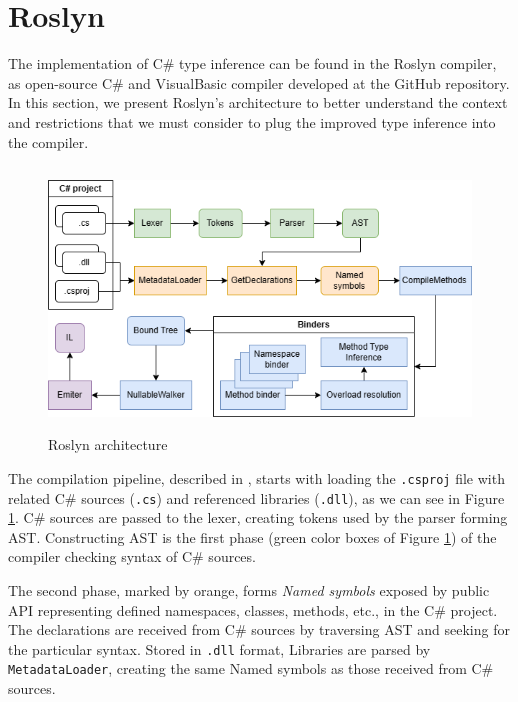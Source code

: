 \section{Roslyn}

The implementation of C\# type inference can be found in the Roslyn compiler, as open-source C\# and VisualBasic compiler developed at the GitHub repository. 
In this section, we present Roslyn’s architecture to better understand the context and restrictions that we must consider to plug the improved type inference into the compiler.
\par
\begin{figure}
\centering
\includegraphics[width=120mm, height=70mm]{../img/Roslyn_Arch.png}
\caption{Roslyn architecture}
\label{img56:roslynPip}
\end{figure}
\par
{}
The compilation pipeline, described in \cite{online:roslynArchitecture}, starts with loading the \texttt{.csproj} file with related C\# sources (\texttt{.cs}) and referenced libraries (\texttt{.dll}), as we can see in Figure \ref{img56:roslynPip}.
C\# sources are passed to the lexer, creating tokens used by the parser forming \ac{AST}.
Constructing \ac{AST} is the first phase (green color boxes of Figure \ref{img56:roslynPip}) of the compiler checking syntax of C\# sources.
\par
{}
The second phase, marked by orange, forms \emph{Named symbols} exposed by public API representing defined namespaces, classes, methods, etc., in the C\# project. 
The declarations are received from C\# sources by traversing AST and seeking for the particular syntax. Stored in \texttt{.dll} format, Libraries are parsed by \texttt{MetadataLoader}, creating the same Named symbols as those received from C\# sources.
